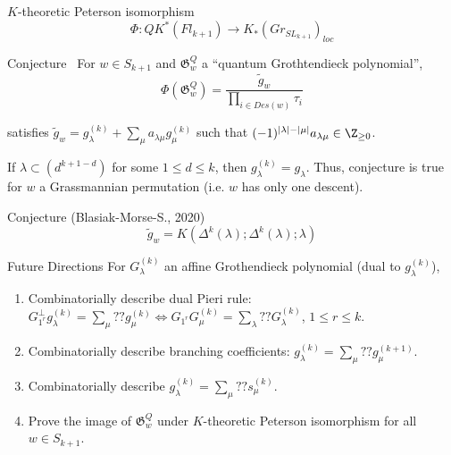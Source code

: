 \documentclass{beamer}
\newcommand{\G}{\mathfrak{G}}
\begin{document}
\begin{frame}{\(K\)-theoretic Peterson isomorphism}
  \vspace{-0.2in}
   \[
    \Phi \colon QK^*(Fl_{k+1}) \to K_*(Gr_{SL_{k+1}})_{loc}
  \]
  \pause
  \vspace{-0.2in}
  \begin{block}{Conjecture~\cite{IIM}}
    For \(w \in S_{k+1}\) and \(\G_w^Q\) a ``quantum Grothtendieck
    polynomial'',
    \vspace{-0.1in}
    \[
      \Phi(\G_w^Q) = \frac{\tilde{g}_w}{\prod_{i \in Des(w)} \tau_i}
    \]

    \pause
    satisfies \(\tilde{g}_w = g_\lambda^{(k)} + \sum_\mu a_{\lambda
      \mu} g_\mu^{(k)}\) such that \((-1)^{|\lambda|-|\mu|}a_{\lambda
      \mu} \in \Z_{\geq 0}\).
  \end{block}\pause
  \begin{theorem}
    If \(\lambda \subset (d^{k+1-d})\) for some \(1 \leq d \leq k\),
    then \(g_\lambda^{(k)} = g_\lambda\). Thus, conjecture is true
    for \(w\) a Grassmannian permutation (i.e. \(w\) has only one descent).
  \end{theorem}\pause
  \begin{block}{Conjecture (Blasiak-Morse-S., 2020)}
    \[\tilde{g}_w = K(\Delta^k(\lambda);\Delta^k(\lambda);\lambda)\]
  \end{block}
\end{frame}
\begin{frame}{Future Directions}
    For \(G_\lambda^{(k)}\) an affine Grothendieck polynomial (dual to \(g_\lambda^{(k)}\)),\pause
    \begin{enumerate}
    \item Combinatorially describe dual Pieri rule: \(G_{1^r}^\perp g_\lambda^{(k)} = \sum_\mu
      ?? g_\mu^{(k)} \iff G_{1^r} G_\mu^{(k)} = \sum_\lambda ?? G_\lambda^{(k)}\),  \(1 \leq r \leq k\).\pause
    \item Combinatorially describe branching coefficients: \(g_\lambda^{(k)} =
      \sum_\mu ?? g_\mu^{(k+1)}\).\pause
    \item Combinatorially describe \(g_\lambda^{(k)} = \sum_\mu ??
      s_\mu^{(k)}\).\pause
    \item Prove the image of \(\G_w^Q\) under \(K\)-theoretic Peterson isomorphism
      for all \(w \in S_{k+1}\).
    \end{enumerate}
\end{frame}
\end{document}
